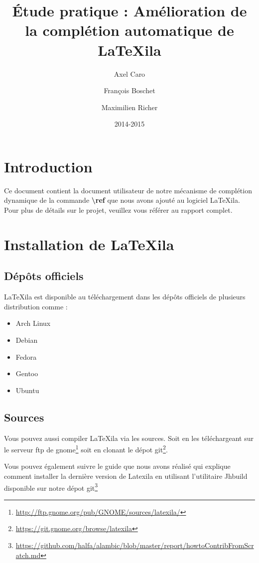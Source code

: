 \documentclass[a4paper,11pt]{report}
\title{Étude pratique : Amélioration de la complétion automatique de \LaTeX{}ila}
\author{Axel Caro\and François Boschet\and Maximilien Richer}
\date{2014-2015}
\begin{document}


\maketitle %

\chapter{Introduction}
\label{cha:Introduction}
Ce document contient la document utilisateur de notre mécanisme de complétion dynamique de la commande \textbf{\textbackslash{}ref} que nous avons ajouté au logiciel \LaTeX{}ila.
Pour plus de détails sur le projet, veuillez vous référer au rapport complet.

\chapter{Installation de \LaTeX{}ila}
\label{cha:Installation}

\section{Dépôts officiels}
\label{sec:depots}

\LaTeX{}ila est disponible au téléchargement dans les dépôts officiels de plusieurs distribution comme :
\begin{itemize}
\item Arch Linux
\item Debian
\item Fedora
\item Gentoo
\item Ubuntu
\end{itemize}

\section{Sources}
\label{sec:sources}

Vous pouvez aussi compiler \LaTeX{}ila via les sources. Soit en les téléchargeant sur le serveur ftp de gnome\footnote{\url{http://ftp.gnome.org/pub/GNOME/sources/latexila/}} soit en clonant le dépot git\footnote{\url{https://git.gnome.org/browse/latexila}}.

Vous pouvez également suivre le guide que nous avons réalisé qui explique comment installer la dernière version de Latexila en utilisant l'utilitaire Jhbuild disponible sur notre dépot git\footnote{\url{https://github.com/halfa/alambic/blob/master/report/howtoContribFromScratch.md}}
\end{document}
